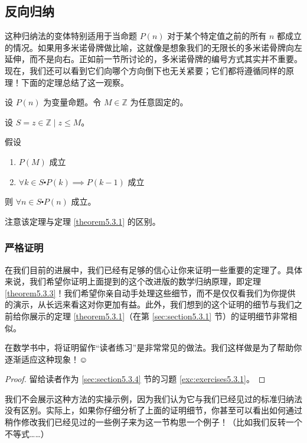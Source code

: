 \subsection{反向归纳}

这种归纳法的变体特别适用于当命题 $P(n)$ 对于某个特定值之前的所有 $n$ 都成立的情况。如果用多米诺骨牌做比喻，这就像是想象我们的无限长的多米诺骨牌向左延伸，而不是向右。正如前一节所讨论的，多米诺骨牌的编号方式其实并不重要。现在，我们还可以看到它们向哪个方向倒下也无关紧要；它们都将遵循同样的原理！下面的定理总结了这一观察。

\begin{theorem}[反向归纳]\label{theorem5.3.3}
    设 $P(n)$ 为变量命题。令 $M \in \mathbb{Z}$ 为任意固定的。

    设 $S = {z \in \mathbb{Z} \mid z \le M}$。

    假设
    \begin{enumerate}[label=(\arabic*)]
        \item $P(M)$ 成立
        \item $\forall k \in S \centerdot P(k) \implies P(k - 1)$ 成立
    \end{enumerate}

    则 $\forall n \in S \centerdot P(n)$ 成立。
\end{theorem}

注意该定理与定理 \ref{theorem5.3.1} 的区别。

\subsubsection*{严格证明}

在我们目前的进展中，我们已经有足够的信心让你来证明一些重要的定理了。具体来说，我们希望你证明上面提到的这个改进版的数学归纳原理，即定理 \ref{theorem5.3.3}！我们希望你亲自动手处理这些细节，而不是仅仅看我们为你提供的演示，从长远来看这对你更加有益。此外，我们想到的这个证明的细节与我们之前给你展示的定理 \ref{theorem5.3.1}（在第 \ref{sec:section5.3.1} 节）的证明细节非常相似。

在数学书中，将证明留作``读者练习''是非常常见的做法。我们这样做是为了帮助你逐渐适应这种现象！$\smiley{}$

\begin{proof}
    留给读者作为 \ref{sec:section5.3.4} 节的习题 \ref{exc:exercises5.3.1}。
\end{proof}

我们不会展示这种方法的实操示例，因为我们认为它与我们已经见过的标准归纳法没有区别。实际上，如果你仔细分析了上面的证明细节，你甚至可以看出如何通过稍作修改我们已经见过的一些例子来为这一节构思一个例子！（比如我们反转一个不等式……）
